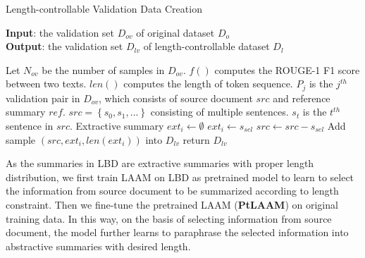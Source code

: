{\begin{algorithm}[th!]
	\caption{Length-controllable Validation Data Creation}
	\label{alg:valid}
	\small
	\textbf{Input}: the validation set $D_{ov}$  of original dataset $D_o$ \\
	\textbf{Output}:  the validation set $D_{lv}$ of length-controllable dataset $D_l$ \\
	\begin{algorithmic}[1] %
		\STATE Let $N_{ov}$ be the number of samples in $D_{ov}$.
		\STATE $f()$ computes the ROUGE-1 F1 score between two texts.
		\STATE $len()$ computes the length of token sequence.
		\STATE $P_j$ is the $j^{th}$ validation pair in $D_{ov}$, which consists of source document $src$ and reference summary $ref$.
		\STATE $src=\left\{s_0, s_1,...\right\}$ consisting of multiple sentences. $s_t$ is the $t^{th}$ sentence in $src$.
		\STATE Extractive summary $ext_i \leftarrow \emptyset$
		\STATE $ext_i \leftarrow s_{sel}$
		\STATE $src \leftarrow src-s_{sel}$
		\ENDWHILE
		\STATE Add sample $(src, ext_i, len(ext_i))$ into $D_{lv}$
		\ENDFOR
		\STATE return $D_{lv}$
	\end{algorithmic}
\end{algorithm}
}%


As the summaries in LBD
are extractive summaries with proper length distribution,
we first train LAAM on LBD
as pretrained model to learn to select the information from source document to be summarized according to length constraint.
Then we fine-tune the pretrained LAAM ({\bf PtLAAM}) on original training data.
In this way, on the basis of selecting information from source document, 
the model further learns to paraphrase the selected information into abstractive summaries with desired length.

